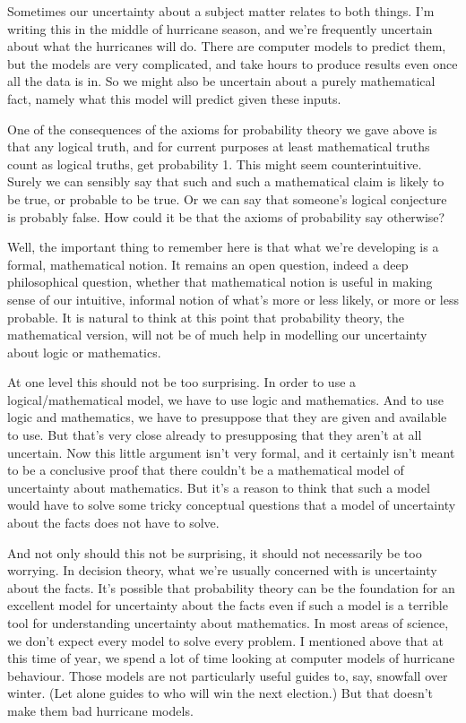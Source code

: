 Sometimes our uncertainty about a subject matter relates to both things. I'm writing this in the middle of hurricane season, and we're frequently uncertain about what the hurricanes will do. There are computer models to predict them, but the models are very complicated, and take hours to produce results even once all the data is in. So we might also be uncertain about a purely mathematical fact, namely what this model will predict given these inputs.

One of the consequences of the axioms for probability theory we gave above is that any logical truth, and for current purposes at least mathematical truths count as logical truths, get probability 1. This might seem counterintuitive. Surely we can sensibly say that such and such a mathematical claim is likely to be true, or probable to be true. Or we can say that someone's logical conjecture is probably false. How could it be that the axioms of probability say otherwise?

Well, the important thing to remember here is that what we're developing is a formal, mathematical notion. It remains an open question, indeed a deep philosophical question, whether that mathematical notion is useful in making sense of our intuitive, informal notion of what's more or less likely, or more or less probable. It is natural to think at this point that probability theory, the mathematical version, will not be of much help in modelling our uncertainty about logic or mathematics.

At one level this should not be too surprising. In order to use a logical/mathematical model, we have to use logic and mathematics. And to use logic and mathematics, we have to presuppose that they are given and available to use. But that's very close already to presupposing that they aren't at all uncertain. Now this little argument isn't very formal, and it certainly isn't meant to be a conclusive proof that there couldn't be a mathematical model of uncertainty about mathematics. But it's a reason to think that such a model would have to solve some tricky conceptual questions that a model of uncertainty about the facts does not have to solve.

And not only should this not be surprising, it should not necessarily be too worrying. In decision theory, what we're usually concerned with is uncertainty about the facts. It's possible that probability theory can be the foundation for an excellent model for uncertainty about the facts even if such a model is a terrible tool for understanding uncertainty about mathematics. In most areas of science, we don't expect every model to solve every problem. I mentioned above that at this time of year, we spend a lot of time looking at computer models of hurricane behaviour. Those models are not particularly useful guides to, say, snowfall over winter. (Let alone guides to who will win the next election.) But that doesn't make them bad hurricane models.

